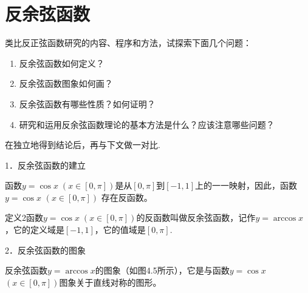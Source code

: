 \section{反余弦函数}
类比反正弦函数研究的内容、程序和方法，试探索下面几个问题：
\begin{enumerate}[(1)]
\item 反余弦函数如何定义？
\item 反余弦函数图象如何画？
\item 反余弦函数有哪些性质？如何证明？
\item 研究和运用反余弦函数理论的基本方法是什么？应该注意哪些问题？
\end{enumerate}

在独立地得到结论后，再与下文做一对比.

1．反余弦函数的建立

函数$y=\cos x\; (x\in[0,\pi])$是从$[0,\pi]$到$[-1,1]$上的一一映射，因此，函数$y=\cos x$ $(x\in[0,\pi])$ 存在反函数。

\begin{thm}
    {定义2}函数$y=\cos x\; (x\in[0,\pi])$的反函数叫做反余弦函数，记作$y=\arccos x$，它的定义域是$[-1,1]$，它的值域是$[0,\pi]$.
\end{thm}

2．反余弦函数的图象

反余弦函数$y=\arccos x$的图象（如图4.5所示），它是与函数$y=\cos x$ $(x\in[0,\pi])$图象关于直线对称的图形。

